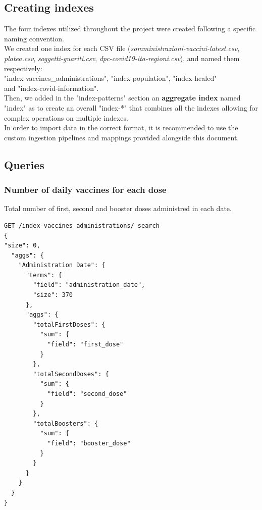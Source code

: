 \documentclass[12pt, a4paper]{article}
\begin{document}
\subsection{Creating indexes}
\label{sec:indexes}

The four indexes utilized throughout the project were created following a specific \\
naming convention. \\
We created one index for each CSV file (\emph{somministrazioni-vaccini-latest.csv}, 
\emph{platea.csv}, \emph{soggetti-guariti.csv}, \emph{dpc-covid19-ita-regioni.csv}),
and named them respectively: \\
"index-vaccines\_administrations", "index-population", 
"index-healed" \\ 
and "index-covid-information". \\
Then, we added in the "index-patterns" section an \textbf{aggregate index} named "index" 
as to create an overall "index-*" that combines all the indexes allowing for complex
operations on multiple indexes. \\
In order to import data in the correct format, it is recommended to use the custom
ingestion pipelines and mappings provided alongside this document.

\subsection{Queries}

\subsubsection{Number of daily vaccines for each dose}
Total number of first, second and booster doses administred in each date.
\begin{tcolorbox}[fontupper=\scriptsize]
  \begin{verbatim}
GET /index-vaccines_administrations/_search
{
"size": 0, 
  "aggs": {
    "Administration Date": {
      "terms": {
        "field": "administration_date",
        "size": 370
      },
      "aggs": {
        "totalFirstDoses": {
          "sum": {
            "field": "first_dose"
          }
        },        
        "totalSecondDoses": {
          "sum": {
            "field": "second_dose"
          }
        },        
        "totalBoosters": {
          "sum": {
            "field": "booster_dose"
          }
        }
      }
    }
  } 
}
  \end{verbatim}
\end{tcolorbox}
\end{document}
